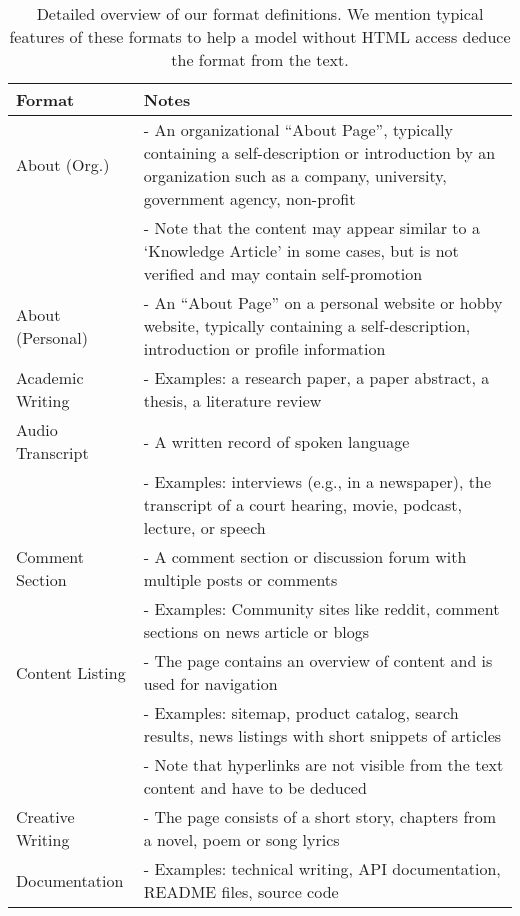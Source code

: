 \begin{table}[!ht]
    \centering
    \ificml\small\else\footnotesize\fi
    \caption{Detailed overview of our {\formats format definitions}. 
    We mention typical features of these formats to help a model without HTML access deduce the format from the text.}
    \icmlskip{0.1in}
\begin{tabular}{l@{\hspace{8pt}}p{}}
\toprule
Format & Notes \\
\midrule
About (Org.) & - An organizational ``About Page'', typically containing a self-description or introduction by an organization such as a company, university, government agency, non-profit \\ 
            & - Note that the content may appear similar to a `Knowledge Article' in some cases, but is not verified and may contain self-promotion \\
\addlinespace[0.05in]
About (Personal) & - An ``About Page'' on a personal website or hobby website, typically containing a self-description, introduction or profile information \\
\addlinespace[0.05in]
Academic Writing & - Examples: a research paper, a paper abstract, a thesis, a literature review \\
\addlinespace[0.05in]
Audio Transcript & - A written record of spoken language \\
            & - Examples: interviews (e.g., in a newspaper), the transcript of a court hearing, movie, podcast, lecture, or speech \\
\addlinespace[0.05in]
Comment Section & - A comment section or discussion forum with multiple posts or comments \\
            & - Examples: Community sites like reddit, comment sections on news article or blogs \\
\addlinespace[0.05in]
Content Listing & - The page contains an overview of content and is used for navigation \\
            & - Examples: sitemap, product catalog, search results, news listings with short snippets of articles \\
            & - Note that hyperlinks are not visible from the text content and have to be deduced \\
\addlinespace[0.05in]
Creative Writing & - The page consists of a short story, chapters from a novel, poem or song lyrics \\
\addlinespace[0.05in]
Documentation & - Examples: technical writing, API documentation, README files, source code \\

\end{tabular}
\end{table}
